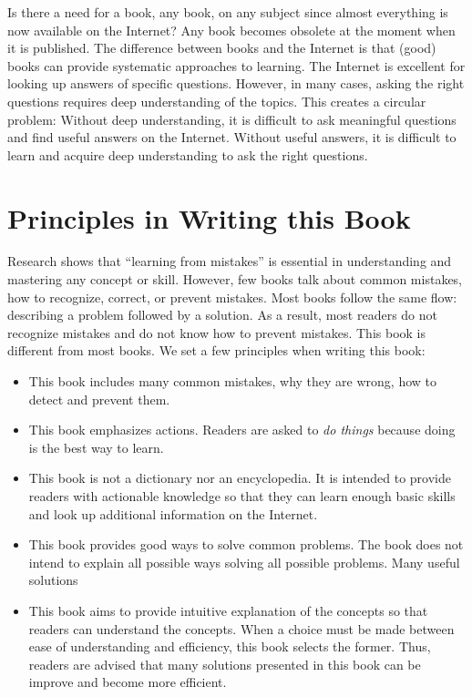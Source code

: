 Is there a need for a book, any book, on any subject since almost
everything is now available on the Internet?  Any book becomes
obsolete at the moment when it is published.  The difference between
books and the Internet is that (good) books can provide systematic
approaches to learning. The Internet is excellent for looking up
answers of specific questions. However, in many cases, asking the
right questions requires deep understanding of the topics.  This
creates a circular problem: Without deep understanding, it is
difficult to ask meaningful questions and find useful answers on the
Internet. Without useful answers, it is difficult to learn and acquire
deep understanding to ask the right questions.

\section*{Principles in Writing this Book}

Research shows that ``learning from mistakes'' is essential in
understanding and mastering any concept or skill.  However, few books
talk about common mistakes, how to recognize, correct, or prevent
mistakes.  Most books follow the same flow: describing a problem
followed by a solution.  As a result, most readers do not recognize
mistakes and do not know how to prevent mistakes.  This book is
different from most books.  We set a few principles when writing this
book:

\begin{itemize}
\item This book includes many common mistakes, why they are wrong, how
  to detect and prevent them.
  
\item This book emphasizes actions. Readers are asked to {\it do
  things} because doing is the best way to learn.

\item This book is not a dictionary nor an encyclopedia.  It is
  intended to provide readers with actionable knowledge so that they
  can learn enough basic skills and look up additional information on
  the Internet.  

\item This book provides good ways to solve common problems.
  The book does not intend to explain all possible ways
  solving all possible problems. Many useful solutions

\item This book aims to provide intuitive explanation of the concepts
  so that readers can understand the concepts.  When a choice must be
  made between ease of understanding and efficiency, this book selects
  the former.  Thus, readers are advised that many solutions presented
  in this book can be improve and become more efficient.
  
\end{itemize}

